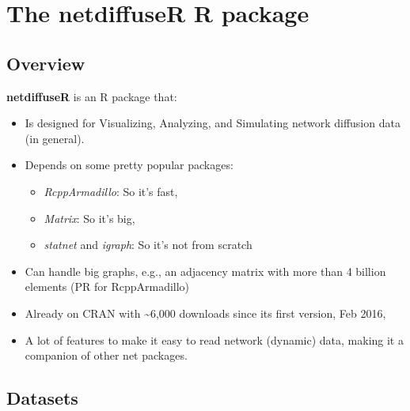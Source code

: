 \documentclass[
]{book}
\providecommand{\tightlist}{%
  \setlength{\itemsep}{0pt}\setlength{\parskip}{0pt}}
\begin{document}
\hypertarget{the-netdiffuser-r-package}{%
\section{The netdiffuseR R package}\label{the-netdiffuser-r-package}}

\hypertarget{overview}{%
\subsection{Overview}\label{overview}}

\textbf{netdiffuseR} is an R package that:

\begin{itemize}
\item
  Is designed for Visualizing, Analyzing, and Simulating network diffusion data (in general).
\item
  Depends on some pretty popular packages:

  \begin{itemize}
  \tightlist
  \item
    \emph{RcppArmadillo}: So it's fast,
  \item
    \emph{Matrix}: So it's big,
  \item
    \emph{statnet} and \emph{igraph}: So it's not from scratch
  \end{itemize}
\item
  Can handle big graphs, e.g., an adjacency matrix with more than 4 billion elements (PR for RcppArmadillo)
\item
  Already on CRAN with \textasciitilde6,000 downloads since its first version, Feb 2016,
\item
  A lot of features to make it easy to read network (dynamic) data, making it a companion of other net packages.
\end{itemize}

\hypertarget{datasets}{%
\subsection{Datasets}\label{datasets}}
\end{document}
